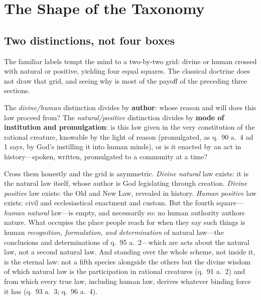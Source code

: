 \section{The Shape of the Taxonomy}

\subsection{Two distinctions, not four boxes}

The familiar labels tempt the mind to a two-by-two grid: divine or human crossed with natural or positive, yielding four equal squares. The classical doctrine does not draw that grid, and seeing why is most of the payoff of the preceding three sections.

The \emph{divine/human} distinction divides by \textbf{author}: whose reason and will does this law proceed from? The \emph{natural/positive} distinction divides by \textbf{mode of institution and promulgation}: is this law given in the very constitution of the rational creature, knowable by the light of reason (promulgated, as q.~90 a.~4 ad 1 says, by God's instilling it into human minds), or is it enacted by an act in history---spoken, written, promulgated to a community at a time?

Cross them honestly and the grid is asymmetric. \emph{Divine natural} law exists: it is the natural law itself, whose author is God legislating through creation. \emph{Divine positive} law exists: the Old and New Law, revealed in history. \emph{Human positive} law exists: civil and ecclesiastical enactment and custom. But the fourth square---\emph{human natural} law---is empty, and necessarily so: no human authority authors nature. What occupies the place people reach for when they say such things is human \emph{recognition, formulation, and determination} of natural law---the conclusions and determinations of q.~95 a.~2---which are acts about the natural law, not a second natural law. And standing over the whole scheme, not inside it, is the eternal law: not a fifth species alongside the others but the divine wisdom of which natural law is the participation in rational creatures (q.~91 a.~2) and from which every true law, including human law, derives whatever binding force it has (q.~93 a.~3; q.~96 a.~4).

